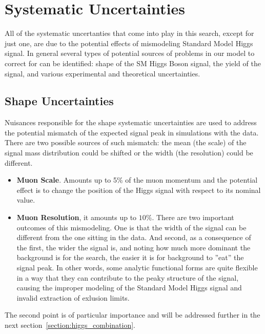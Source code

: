 \section{Systematic Uncertainties} \label{section:higgs_systematics}
All of the systematic uncertanties that come into play in this search, except for just one, are due to the potential effects of mismodeling Standard Model Higgs signal. In general several types of potential sources of problems in our model to correct for can be identified: shape of the SM Higgs Boson signal, the yield of the signal, and various experimental and theoretical uncertainties.

\subsection{Shape Uncertainties}
Nuisances responsible for the shape systematic uncertainties are used to address the potential mismatch of the expected signal peak in simulations with the data. There are two possible sources of such mismatch: the mean (the scale) of the signal mass distribution could be shifted or the width (the resolution) could be different.
\begin{itemize}
    \item {\bf Muon Scale}. Amounts up to 5\% of the muon momentum and the potential effect is to change the position of the Higgs signal with respect to its nominal value.
    \item {\bf Muon Resolution}, it amounts up to $10\%$. There are two important outcomes of this mismodeling. One is that the width of the signal can be different from the one sitting in the data. And second, as a consequence of the first, the wider the signal is, and noting how much more dominant the background is for the search, the easier it is for background to ''eat'' the signal peak. In other words, some analytic functional forms are quite flexible in a way that they can contribute to the peaky structure of the signal, causing the improper modeling of the Standard Model Higgs signal and invalid extraction of exlusion limits.
\end{itemize}
The second point is of particular importance and will be addressed further in the next section~\ref{section:higgs_combination}.


